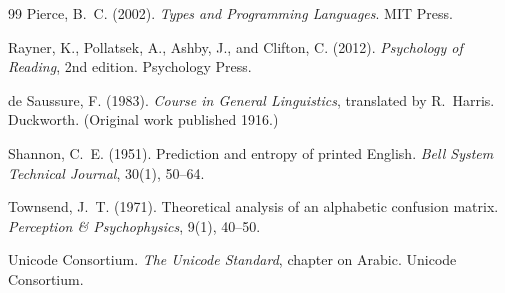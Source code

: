 \begin{thebibliography}{99}
Pierce, B.~C. (2002). \emph{Types and Programming Languages}. MIT Press.

Rayner, K., Pollatsek, A., Ashby, J., and Clifton, C. (2012). \emph{Psychology of Reading}, 2nd edition. Psychology Press.

de Saussure, F. (1983). \emph{Course in General Linguistics}, translated by R.~Harris. Duckworth. (Original work published 1916.)

Shannon, C.~E. (1951). Prediction and entropy of printed English. \emph{Bell System Technical Journal}, 30(1), 50--64.

Townsend, J.~T. (1971). Theoretical analysis of an alphabetic confusion matrix. \emph{Perception \& Psychophysics}, 9(1), 40--50.

Unicode Consortium. \emph{The Unicode Standard}, chapter on Arabic. Unicode Consortium.

\end{thebibliography}
